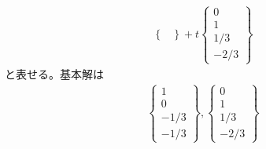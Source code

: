 \begin{ans*}
\begin{align}
\begin{Bmatrix}
    \end{Bmatrix}
    + t
    \begin{Bmatrix}
      0 \\ 1 \\ 1/3 \\ -2/3
    \end{Bmatrix}
  \end{align}
  と表せる。基本解は
  \begin{align}
    \begin{Bmatrix}
      1 \\ 0 \\ -1/3 \\ -1/3 
    \end{Bmatrix}, 
    \begin{Bmatrix}
      0 \\ 1 \\ 1/3 \\ -2/3
    \end{Bmatrix}
  \end{align}
\end{ans*}


